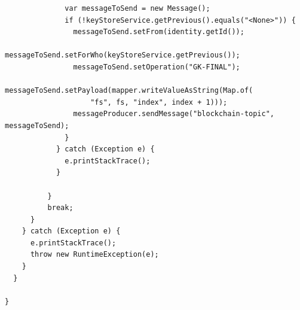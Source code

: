 \documentclass[12pt,a4paper]{report}
\begin{document}
\begin{verbatim}
              var messageToSend = new Message();
              if (!keyStoreService.getPrevious().equals("<None>")) {
                messageToSend.setFrom(identity.getId());
                messageToSend.setForWho(keyStoreService.getPrevious());
                messageToSend.setOperation("GK-FINAL");
                messageToSend.setPayload(mapper.writeValueAsString(Map.of(
                    "fs", fs, "index", index + 1)));
                messageProducer.sendMessage("blockchain-topic", messageToSend);
              }
            } catch (Exception e) {
              e.printStackTrace();
            }

          }
          break;
      }
    } catch (Exception e) {
      e.printStackTrace();
      throw new RuntimeException(e);
    }
  }

}

	
\end{verbatim}
\end{document}
